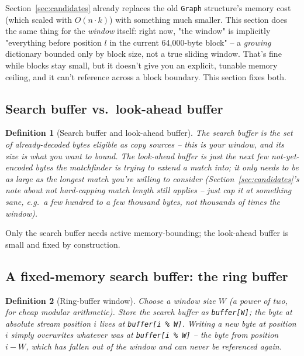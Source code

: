 \documentclass[11pt]{article}
\newtheorem{definition}{Definition}
\begin{document}
Section~\ref{sec:candidates} already replaces the old \texttt{Graph} structure's memory
cost (which scaled with $O(n\cdot k)$) with something much smaller. This section does
the same thing for the \emph{window} itself: right now, "the window" is implicitly
"everything before position $l$ in the current 64{,}000-byte block" -- a
\emph{growing} dictionary bounded only by block size, not a true sliding window. That's
fine while blocks stay small, but it doesn't give you an explicit, tunable memory
ceiling, and it can't reference across a block boundary. This section fixes both.

\subsection{Search buffer vs.\ look-ahead buffer}

\begin{definition}[Search buffer and look-ahead buffer]
The \emph{search buffer} is the set of already-decoded bytes eligible as copy sources
-- this is your window, and its size is what you want to bound. The \emph{look-ahead
buffer} is just the next few not-yet-encoded bytes the matchfinder is trying to extend
a match into; it only needs to be as large as the longest match you're willing to
consider (Section~\ref{sec:candidates}'s note about not hard-capping match length still
applies -- just cap it at something sane, e.g.\ a few hundred to a few thousand bytes,
not thousands of times the window).
\end{definition}

Only the search buffer needs active memory-bounding; the look-ahead buffer is small and
fixed by construction.

\subsection{A fixed-memory search buffer: the ring buffer}
\label{sec:ringbuffer}

\begin{definition}[Ring-buffer window]
Choose a window size $W$ (a power of two, for cheap modular arithmetic). Store the
search buffer as \texttt{buffer[W]}; the byte at absolute stream position $i$ lives at
\texttt{buffer[i \% W]}. Writing a new byte at position $i$ simply overwrites whatever
was at \texttt{buffer[i \% W]} -- the byte from position $i - W$, which has fallen out
of the window and can never be referenced again.
\end{definition}
\end{document}
